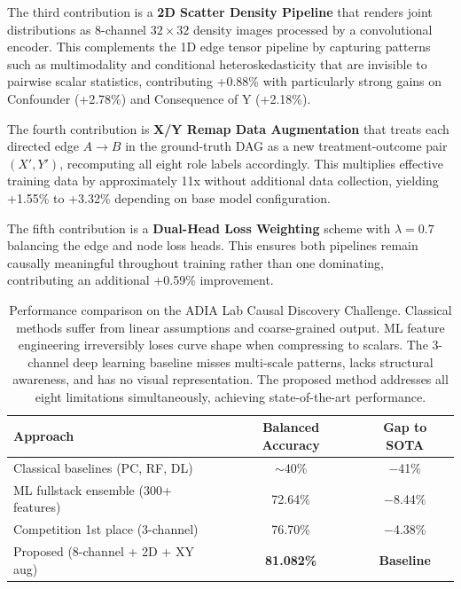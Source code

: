 The third contribution is a \textbf{2D Scatter Density Pipeline} that renders joint distributions as 8-channel $32\times32$ density images processed by a convolutional encoder. This complements the 1D edge tensor pipeline by capturing patterns such as multimodality and conditional heteroskedasticity that are invisible to pairwise scalar statistics, contributing +0.88\% with particularly strong gains on Confounder (+2.78\%) and Consequence of Y (+2.18\%).

The fourth contribution is \textbf{X/Y Remap Data Augmentation} that treats each directed edge $A\to B$ in the ground-truth DAG as a new treatment-outcome pair $(X',Y')$, recomputing all eight role labels accordingly. This multiplies effective training data by approximately 11x without additional data collection, yielding +1.55\% to +3.32\% depending on base model configuration.

The fifth contribution is a \textbf{Dual-Head Loss Weighting} scheme with $\lambda=0.7$ balancing the edge and node loss heads. This ensures both pipelines remain causally meaningful throughout training rather than one dominating, contributing an additional +0.59\% improvement.

\begin{table}[ht]
	\centering
	\caption{Performance comparison on the ADIA Lab Causal Discovery Challenge.
		Classical methods suffer from linear assumptions and coarse-grained output.
		ML feature engineering irreversibly loses curve shape when compressing to scalars.
		The 3-channel deep learning baseline misses multi-scale patterns, lacks structural awareness, and has no visual representation.
		The proposed method addresses all eight limitations simultaneously, achieving state-of-the-art performance.}
	\label{tab:sota_comparison}
	\begin{tabular}{lcc}
		\toprule
		\textbf{Approach}                                           & \textbf{Balanced Accuracy} & \textbf{Gap to SOTA} \\
		\midrule
		Classical baselines (PC, RF, DL)~\cite{olivetti2025adialab} & $\sim$40\%                 & $-$41\%              \\
		ML fullstack ensemble (300+ features)                       & 72.64\%                    & $-$8.44\%            \\
		Competition 1st place (3-channel)~\cite{adia_rank1_report}  & 76.70\%                    & $-$4.38\%            \\
		Proposed (8-channel + 2D + XY aug)                          & \textbf{81.082\%}          & \textbf{Baseline}    \\
		\bottomrule
	\end{tabular}
\end{table}

